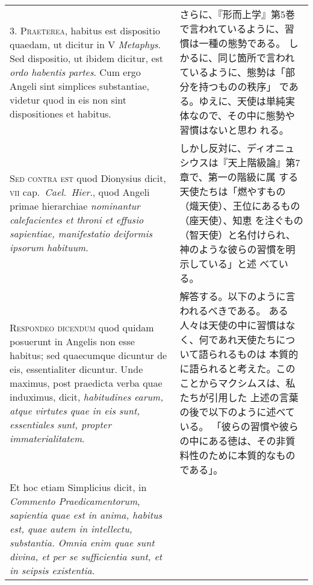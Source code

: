 \documentclass[10pt]{jsarticle} %
\begin{document}
\begin{longtable}{p{21em}p{21em}}
\\



3. {\scshape Praeterea}, habitus est dispositio quaedam, ut dicitur in
 V {\itshape Metaphys}. Sed dispositio, ut ibidem dicitur, est
 {\itshape ordo habentis partes}. Cum ergo Angeli sint simplices
 substantiae, videtur quod in eis non sint dispositiones et habitus.

&

さらに、『形而上学』第5巻で言われているように、習慣は一種の態勢である。
しかるに、同じ箇所で言われているように、態勢は「部分を持つものの秩序」
 である。ゆえに、天使は単純実体なので、その中に態勢や習慣はないと思わ
 れる。

\\



{\scshape Sed contra est} quod Dionysius dicit, {\scshape vii}
 cap.~{\itshape Cael.~Hier}., quod Angeli primae hierarchiae {\itshape
 nominantur calefacientes et throni et effusio sapientiae,
 manifestatio deiformis ipsorum habituum}.

&

しかし反対に、ディオニュシウスは『天上階級論』第7章で、第一の階級に属
 する天使たちは「燃やすもの（熾天使）、王位にあるもの（座天使）、知恵
 を注ぐもの（智天使）と名付けられ、神のような彼らの習慣を明示している」と述
 べている。

\\



{\scshape Respondeo dicendum} quod quidam posuerunt in Angelis non
 esse habitus; sed quaecumque dicuntur de eis, essentialiter
 dicuntur. Unde maximus, post praedicta verba quae induximus, dicit,
 {\itshape habitudines earum, atque virtutes quae in eis sunt,
 essentiales sunt, propter immaterialitatem}.

&

解答する。以下のように言われるべきである。
ある人々は天使の中に習慣はなく、何であれ天使たちについて語られるものは
 本質的に語られると考えた。このことからマクシムスは、私たちが引用した
 上述の言葉の後で以下のように述べている。
「彼らの習慣や彼らの中にある徳は、その非質料性のために本質的なものである」。


\\


Et hoc etiam Simplicius dicit, in {\itshape Commento
 Praedicamentorum}, {\itshape sapientia quae est in anima, habitus est, quae
 autem in intellectu, substantia. Omnia enim quae sunt divina, et per
 se sufficientia sunt, et in seipsis existentia}. 



\end{longtable}
\end{document}
